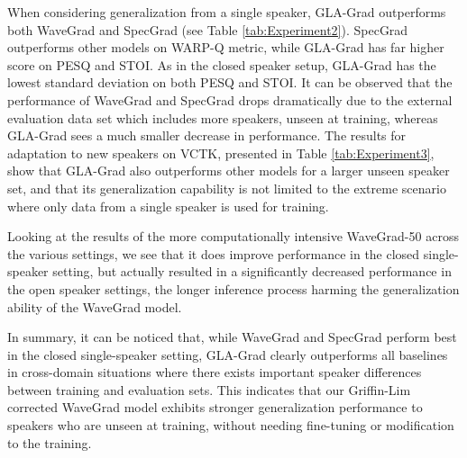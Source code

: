 When considering generalization from a single speaker, GLA-Grad outperforms both WaveGrad and SpecGrad (see Table \ref{tab:Experiment2}). SpecGrad outperforms other models on WARP-Q metric, while GLA-Grad has far higher score on PESQ and STOI. As in the closed speaker setup, %
GLA-Grad has the lowest standard deviation on both PESQ and STOI. It can be observed that the performance of WaveGrad and SpecGrad drops dramatically due to the external evaluation data set which includes more speakers, unseen at training, whereas GLA-Grad sees a much smaller decrease in performance.
The results for adaptation to new speakers on VCTK, presented in Table \ref{tab:Experiment3}, show that GLA-Grad also outperforms other models for a larger unseen speaker set, and that its generalization capability is not limited to the extreme scenario where only data from a single speaker is used for training. 

Looking at the results of the more computationally intensive WaveGrad-50 across the various settings, we see that it does improve performance in the closed single-speaker setting, but actually resulted in a significantly decreased performance in the open speaker settings, the longer inference process harming the generalization ability of the WaveGrad model.

In summary, it can be noticed that, while WaveGrad and SpecGrad perform best in the closed single-speaker setting, %
GLA-Grad clearly outperforms all baselines in cross-domain situations where there exists important speaker differences between training and evaluation sets. 
This indicates that our Griffin-Lim corrected WaveGrad model exhibits stronger generalization performance to speakers who are unseen at training, without needing fine-tuning or modification to the training. 

